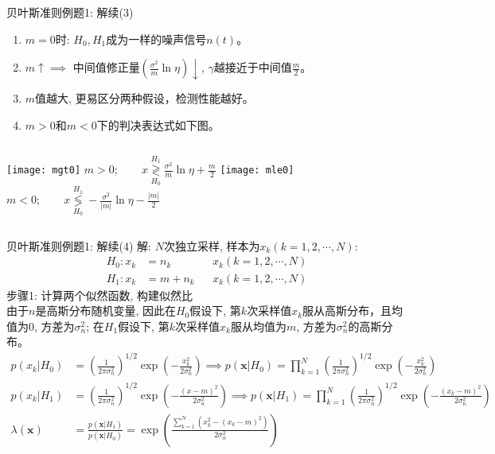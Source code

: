 \begin{frame}[shrink]{贝叶斯准则例题1: 解续(3)}
\begin{enumerate}
	\item $m=0$时: $H_0,H_1$成为一样的噪声信号$n(t)$。
	\item $m\uparrow\implies$ 中间值修正量$(\frac{\sigma^2}{m}\ln\eta)\downarrow$, $\gamma$越接近于中间值$\frac{m}{2}$。
	\item $m$值越大, 更易区分两种假设，检测性能越好。
	\item $m>0$和$m<0$下的判决表达式如下图。
\end{enumerate}	
\begin{columns}
	\texttt{[image: mgt0]}
	$m>0;\qquad x\mathop{\gtrless}\limits_{H_0}^{H_1}\frac{\sigma^2}{m}\ln\eta+\frac{m}{2}$
	\texttt{[image: mle0]}
	$m<0;\qquad x\mathop{\lessgtr}\limits_{H_0}^{H_1}-\frac{\sigma^2}{|m|}\ln\eta-\frac{|m|}{2}$
\end{columns}
\end{frame}

\begin{frame}[shrink]{贝叶斯准则例题1: 解续(4)}
解: $N$次独立采样, 样本为$x_k(k=1,2,\cdots,N)$:
\begin{align*}
H_0: x_k&=n_k && x_k(k=1,2,\cdots,N)\\
H_1: x_k&=m+n_k && x_k(k=1,2,\cdots,N)
\end{align*}
步骤1: 计算两个似然函数, 构建似然比\\
由于$n$是高斯分布随机变量, 因此在$H_0$假设下, 第$k$次采样值$x_k$服从高斯分布，且均值为0, 方差为$\sigma_n^2$; 在$H_1$假设下, 第$k$次采样值$x_k$服从均值为$m$, 方差为$\sigma_n^2$的高斯分布。
\begin{align*}
p(x_k|H_0)&=\left(\frac{1}{2\pi\sigma_n^2}\right)^{1/2}\exp\left(-\frac{x_k^2}{2\sigma_n^2}\right)\implies p(\bm{x}|H_0)=\prod_{k=1}^{N}\left(\frac{1}{2\pi\sigma_n^2}\right)^{1/2}\exp\left(-\frac{x_k^2}{2\sigma_n^2}\right)\\
p(x_k|H_1)&=\left(\frac{1}{2\pi\sigma_n^2}\right)^{1/2}\exp\left(-\frac{(x-m)^2}{2\sigma_n^2}\right)\implies p(\bm{x}|H_1)=\prod_{k=1}^{N}\left(\frac{1}{2\pi\sigma_n^2}\right)^{1/2}\exp\left(-\frac{(x_k-m)^2}{2\sigma_n^2}\right)\\
\lambda(\bm{x})&=\frac{p(\bm{x}|H_1)}{p(\bm{x}|H_0)}=\exp\left(\frac{\sum\limits_{k=1}^{N}(x_k^2-(x_k-m)^2)}{2\sigma_n^2}\right)
\end{align*} 
\end{frame}

